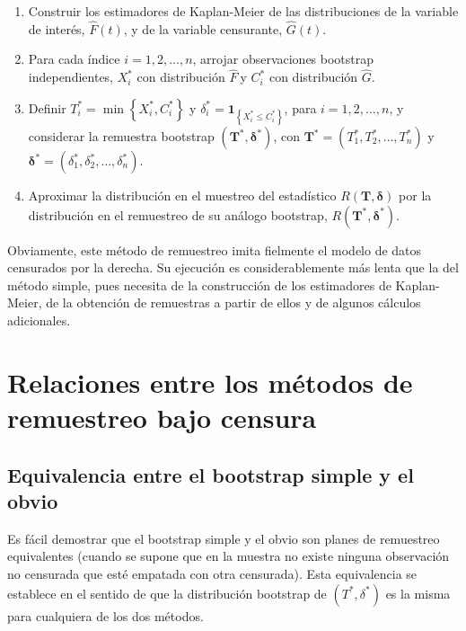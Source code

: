\documentclass[]{book}
\theoremstyle{definition}
\theoremstyle{definition}
\theoremstyle{definition}
\theoremstyle{remark}
\begin{document}
\begin{enumerate}
\def\labelenumi{\arabic{enumi}.}
\item
  Construir los estimadores de Kaplan-Meier de las distribuciones de la
  variable de interés, \(\hat{F}\left( t \right)\), y de la variable
  censurante, \(\hat{G}\left( t \right)\).
\item
  Para cada índice \(i=1,2,\ldots ,n\), arrojar observaciones bootstrap
  independientes, \(X_i^{\ast}\) con distribución \(\hat{F}\ \)y
  \(C_i^{\ast}\) con distribución \(\hat{G}\).
\item
  Definir \(T_i^{\ast}=\min \left\{ X_i^{\ast},C_i^{\ast}\right\}\) y
  \(\delta_i^{\ast}=\mathbf{1}_{\left\{ X_i^{\ast}\leq C_i^{\ast}\right\}}\),
  para \(i = 1, 2, \ldots, n\), y considerar la remuestra bootstrap
  \(\left( \mathbf{T}^{\ast},\boldsymbol{\delta}^{\ast}\right)\), con
  \(\mathbf{T}^{\ast}=\left( T_1^{\ast},T_2^{\ast}, \ldots, T_n^{\ast} \right)\)
  y
  \(\boldsymbol{\delta}^{\ast} = \left( \delta_1^{\ast}, \delta_2^{\ast},\ldots ,\delta_n^{\ast} \right)\).
\item
  Aproximar la distribución en el muestreo del estadístico
  \(R\left( \mathbf{T},\boldsymbol{\delta} \right)\) por la distribución
  en el remuestreo de su análogo bootstrap,
  \(R\left( \mathbf{T}^{\ast},\boldsymbol{\delta}^{\ast} \right)\).
\end{enumerate}

Obviamente, este método de remuestreo imita fielmente el modelo de datos
censurados por la derecha. Su ejecución es considerablemente más lenta
que la del método simple, pues necesita de la construcción de los
estimadores de Kaplan-Meier, de la obtención de remuestras a partir de
ellos y de algunos cálculos adicionales.

\section{Relaciones entre los métodos de remuestreo bajo
censura}\label{relaciones-entre-los-metodos-de-remuestreo-bajo-censura}

\subsection{Equivalencia entre el bootstrap simple y el
obvio}\label{equivalencia-entre-el-bootstrap-simple-y-el-obvio}

Es fácil demostrar que el bootstrap simple y el obvio son planes de
remuestreo equivalentes (cuando se supone que en la muestra no existe
ninguna observación no censurada que esté empatada con otra censurada).
Esta equivalencia se establece en el sentido de que la distribución
bootstrap de \(\left( T^{\ast},\delta^{\ast} \right)\) es la misma para
cualquiera de los dos métodos.
\end{document}
